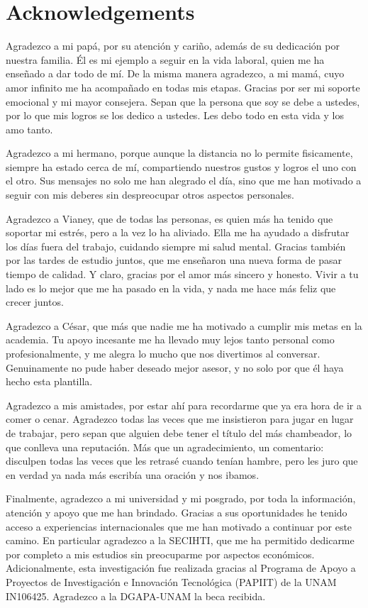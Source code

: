 \chapter*{Acknowledgements}

Agradezco a mi pap\'a, por su atenci\'on y cari\~no, adem\'as de su dedicaci\'on
por nuestra familia. \'El es mi ejemplo a seguir en la vida laboral, quien me ha
ense\~nado a dar todo de m\'i. De la misma manera agradezco, a mi mam\'a, cuyo
amor infinito me ha acompa\~nado en todas mis etapas. Gracias por ser mi soporte
emocional y mi mayor consejera. Sepan que la persona que soy se debe a ustedes,
por lo que mis logros se los dedico a ustedes. Les debo todo en esta vida y los
amo tanto.

Agradezco a mi hermano, porque aunque la distancia no lo permite fisicamente,
siempre ha estado cerca de m\'i, compartiendo nuestros gustos y logros el uno
con el otro. Sus mensajes no solo me han alegrado el d\'ia, sino que me han
motivado a seguir con mis deberes sin despreocupar otros aspectos personales.

Agradezco a Vianey, que de todas las personas, es quien m\'as ha tenido que
soportar mi estr\'es, pero a la vez lo ha aliviado. Ella me ha ayudado a
disfrutar los d\'ias fuera del trabajo, cuidando siempre mi salud mental.
Gracias tambi\'en por las tardes de estudio juntos, que me ense\~naron una nueva
forma de pasar tiempo de calidad. Y claro, gracias por el amor m\'as sincero y
honesto. Vivir a tu lado es lo mejor que me ha pasado en la vida, y nada me hace
m\'as feliz que crecer juntos.

Agradezco a C\'esar, que m\'as que nadie me ha motivado a cumplir mis metas en
la academia. Tu apoyo incesante me ha llevado muy lejos tanto personal como
profesionalmente, y me alegra lo mucho que nos divertimos al conversar.
Genuinamente no pude haber deseado mejor asesor, y no solo por que \'el haya
hecho esta plantilla.

Agradezco a mis amistades, por estar ah\'i para recordarme que ya era hora de ir
a comer o cenar. Agradezco todas las veces que me insistieron para jugar en
lugar de trabajar, pero sepan que alguien debe tener el t\'itulo del m\'as
chambeador, lo que conlleva una reputaci\'on. M\'as que un agradecimiento, un
comentario: disculpen todas las veces que les retras\'e cuando ten\'ian hambre,
pero les juro que en verdad ya nada m\'as escrib\'ia una oraci\'on y nos ibamos.

Finalmente, agradezco a mi universidad y mi posgrado, por toda la informaci\'on,
atenci\'on y apoyo que me han brindado. Gracias a sus oportunidades he tenido
acceso a experiencias internacionales que me han motivado a continuar por este
camino. En particular agradezco a la SECIHTI, que me ha permitido dedicarme por
completo a mis estudios sin preocuparme por aspectos econ\'omicos.
Adicionalmente, esta investigaci\'on fue realizada gracias al Programa de Apoyo
a Proyectos de Investigaci\'on e Innovaci\'on Tecnol\'ogica (PAPIIT) de la UNAM
IN106425. Agradezco a la DGAPA-UNAM la beca recibida.